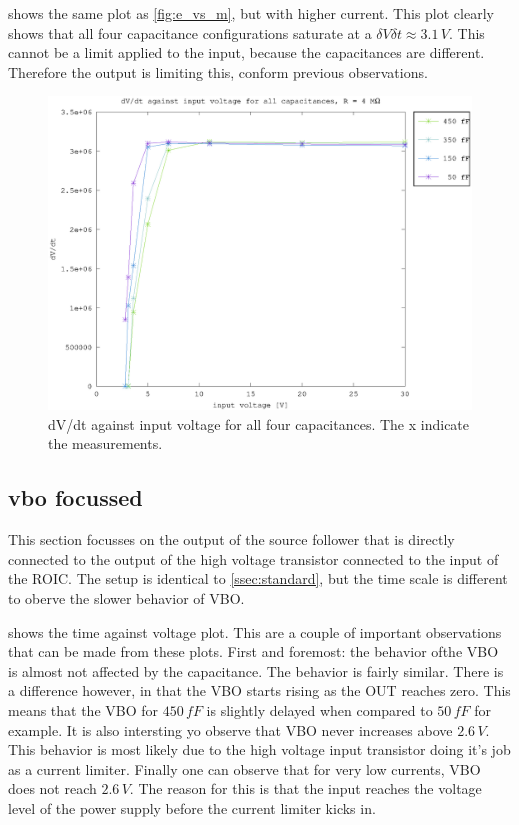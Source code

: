 \documentclass{article}
\begin{document}
 shows the same plot as \cref{fig:e_vs_m}, but with higher current. This plot clearly shows that all four capacitance configurations saturate at a $\delta V\delta t \approx 3.1\,V$. This cannot be a limit applied to the input, because the capacitances are different. Therefore the output is limiting this, conform previous observations.

\begin{figure}[h]
	    \centering
	    \includegraphics[width=\textwidth]{fig/bre_vin_vs_time_sat.eps}
	    \caption[]%
	    {dV/dt against input voltage for all four capacitances. The x indicate the measurements.}    
	    \label{fig:bre_e_vs_m}	
\end{figure}

\clearpage
\subsection{vbo  focussed}
This section focusses on the output of the source follower that is directly connected to the output of the high voltage transistor connected to the input of the ROIC. The setup is identical to \cref{ssec:standard}, but the time scale is different to oberve the slower behavior of VBO.

 shows the time against voltage plot. This are a couple of important observations that can be made from these plots. First and foremost: the behavior ofthe VBO is almost not affected by the capacitance. The behavior is fairly similar. There is a difference however, in that the VBO starts rising as the OUT reaches zero. This means that the VBO for $450\,fF$ is slightly delayed when compared to $50\,fF$ for example. It is also intersting yo observe that VBO never increases above $2.6\,V$. This behavior is most likely due to the high voltage input transistor doing it's job as a current limiter. Finally one can observe that for very low currents, VBO does not reach $2.6\,V$. The reason for this is that the input reaches the voltage level of the power supply before the current limiter kicks in.
\end{document}
